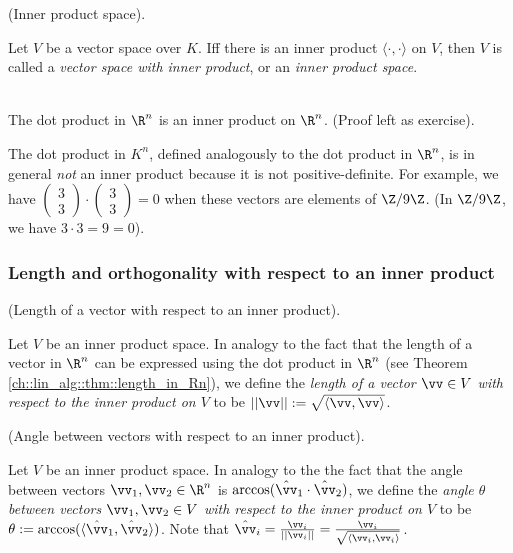 \begin{defn}
    (Inner product space).
    
    Let $V$ be a vector space over $K$. Iff there is an inner product $\langle \cdot, \cdot \rangle$ on $V$, then $V$ is called a \textit{vector space with inner product}, or an \textit{inner product space}.
\end{defn}

\begin{example}
    \mbox{} \\ \indent
    The dot product in $\R^n$ is an inner product on $\R^n$. (Proof left as exercise). 
    
    The dot product in $K^n$, defined analogously to the dot product in $\R^n$, is in general \textit{not} an inner product because it is not positive-definite. For example, we have $\begin{pmatrix} 3 \\ 3 \end{pmatrix} \cdot \begin{pmatrix} 3 \\ 3 \end{pmatrix} = 0$ when these vectors are elements of $\Z/9\Z$. (In $\Z/9\Z$, we have $3 \cdot 3 = 9 = 0$).
\end{example}

\subsubsection*{Length and orthogonality with respect to an inner product}

\begin{defn}
    (Length of a vector with respect to an inner product). 
    
    Let $V$ be an inner product space. In analogy to the fact that the length of a vector in $\R^n$ can be expressed using the dot product in $\R^n$ (see Theorem \ref{ch::lin_alg::thm::length_in_Rn}), we define the \textit{length of a vector $\vv \in V$ with respect to the inner product on $V$} to be $||\vv|| := \sqrt{\langle \vv, \vv \rangle}$.
\end{defn}

\begin{defn}
    (Angle between vectors with respect to an inner product). 
    
    Let $V$ be an inner product space. In analogy to the the fact that the angle between vectors $\vv_1, \vv_2 \in \R^n$ is $\arccos(\hat{\vv}_1 \cdot \hat{\vv}_2)$, we define the \textit{angle $\theta$ between vectors $\vv_1, \vv_2 \in V$ with respect to the inner product on $V$} to be $\theta := \arccos(\langle \hat{\vv}_1, \hat{\vv}_2 \rangle)$. Note that $\hat{\vv}_i = \frac{\vv_i}{||\vv_i||} = \frac{\vv_i}{\sqrt{\langle \vv_i, \vv_i \rangle}}$.
\end{defn}


